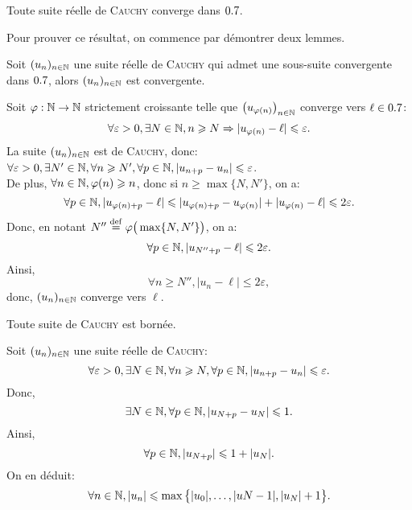 \begin{theo}{}
    Toute suite réelle de \textsc{Cauchy} converge dans $0.7$.
\end{theo}

Pour prouver ce résultat, on commence par démontrer deux lemmes.

\begin{lemme}
    Soit $(u_n)_{n \in \mathbb{N}}$ une suite réelle de \textsc{Cauchy} qui admet une sous-suite convergente dans $0.7$, alors $(u_n)_{n \in \mathbb{N}}$ est convergente. 
\end{lemme}

\begin{preuve}
    Soit $\varphi : \mathbb{N} \to \mathbb{N}$ strictement croissante telle que $\left( u_{\varphi(n)} \right)_{n \in \mathbb{N}}$ converge vers $\ell \in 0.7$:
    $$\forall \varepsilon > 0, \exists N \in \mathbb{N}, n \geqslant N \Rightarrow |u_{\varphi(n)} - \ell| \leqslant \varepsilon.$$
    La suite $(u_n)_{n \in \mathbb{N}}$ est de \textsc{Cauchy}, donc: $\forall \varepsilon > 0, \exists N' \in \mathbb{N}, \forall n \geqslant N', \forall p \in \mathbb{N}, |u_{n+p} - u_n| \leqslant \varepsilon$. \\
    De plus, $\forall n \in \mathbb{N}, \varphi(n) \geqslant n$, donc si $n \geqslant \max \{ N, N' \}$, on a:
    $$\forall p \in \mathbb{N}, |u_{\varphi(n) + p} - \ell| \leqslant |u_{\varphi(n) + p} - u_{\varphi(n)}| + |u_{\varphi(n)} - \ell| \leqslant 2 \varepsilon.$$
    Donc, en notant $N'' \overset{\mathrm{\tiny def}}{=} \varphi \big( \max \{ N, N' \} \big)$, on a:
    $$\forall p \in \mathbb{N}, |u_{N'' + p} - \ell| \leqslant 2 \varepsilon.$$
    Ainsi, 
    $$\forall n \geqslant N'', |u_n - \ell| \leqslant 2 \varepsilon,$$
    donc, $(u_n)_{n \in \mathbb{N}}$ converge vers $\ell$.
\end{preuve}

\begin{lemme}
    Toute suite de \textsc{Cauchy} est bornée.
\end{lemme}

\begin{preuve}
    Soit $(u_n)_{n \in \mathbb{N}}$ une suite réelle de \textsc{Cauchy}:
    $$\forall \varepsilon > 0, \exists N \in \mathbb{N}, \forall n \geqslant N, \forall p \in \mathbb{N}, |u_{n+p} - u_n| \leqslant \varepsilon.$$
    Donc, 
    $$\exists N \in \mathbb{N}, \forall p \in \mathbb{N}, |u_{N+p} - u_N| \leqslant 1.$$
    Ainsi, 
    $$\forall p \in \mathbb{N}, |u_{N+p}| \leqslant 1 + |u_N|.$$
    On en déduit:
    $$\forall n \in \mathbb{N}, |u_n| \leqslant \max \big\{ |u_0|, \dots, |u{N-1}|, |u_N|+1 \big\}.$$
\end{preuve}

